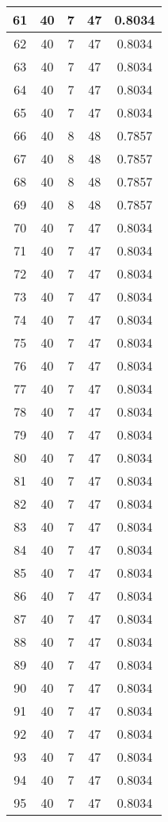 \documentclass[letterpaper, 12pt]{article}
\begin{document}
\begin{longtable}{|c|c|c|c|c|}
61 & 40 & 7 & 47 & 0.8034 \\
\hline
62 & 40 & 7 & 47 & 0.8034 \\
\hline
63 & 40 & 7 & 47 & 0.8034 \\
\hline
64 & 40 & 7 & 47 & 0.8034 \\
\hline
65 & 40 & 7 & 47 & 0.8034 \\
\hline
66 & 40 & 8 & 48 & 0.7857 \\
\hline
67 & 40 & 8 & 48 & 0.7857 \\
\hline
68 & 40 & 8 & 48 & 0.7857 \\
\hline
69 & 40 & 8 & 48 & 0.7857 \\
\hline
70 & 40 & 7 & 47 & 0.8034 \\
\hline
71 & 40 & 7 & 47 & 0.8034 \\
\hline
72 & 40 & 7 & 47 & 0.8034 \\
\hline
73 & 40 & 7 & 47 & 0.8034 \\
\hline
74 & 40 & 7 & 47 & 0.8034 \\
\hline
75 & 40 & 7 & 47 & 0.8034 \\
\hline
76 & 40 & 7 & 47 & 0.8034 \\
\hline
77 & 40 & 7 & 47 & 0.8034 \\
\hline
78 & 40 & 7 & 47 & 0.8034 \\
\hline
79 & 40 & 7 & 47 & 0.8034 \\
\hline
80 & 40 & 7 & 47 & 0.8034 \\
\hline
81 & 40 & 7 & 47 & 0.8034 \\
\hline
82 & 40 & 7 & 47 & 0.8034 \\
\hline
83 & 40 & 7 & 47 & 0.8034 \\
\hline
84 & 40 & 7 & 47 & 0.8034 \\
\hline
85 & 40 & 7 & 47 & 0.8034 \\
\hline
86 & 40 & 7 & 47 & 0.8034 \\
\hline
87 & 40 & 7 & 47 & 0.8034 \\
\hline
88 & 40 & 7 & 47 & 0.8034 \\
\hline
89 & 40 & 7 & 47 & 0.8034 \\
\hline
90 & 40 & 7 & 47 & 0.8034 \\
\hline
91 & 40 & 7 & 47 & 0.8034 \\
\hline
92 & 40 & 7 & 47 & 0.8034 \\
\hline
93 & 40 & 7 & 47 & 0.8034 \\
\hline
94 & 40 & 7 & 47 & 0.8034 \\
\hline
95 & 40 & 7 & 47 & 0.8034 \\

\end{longtable}
\end{document}

